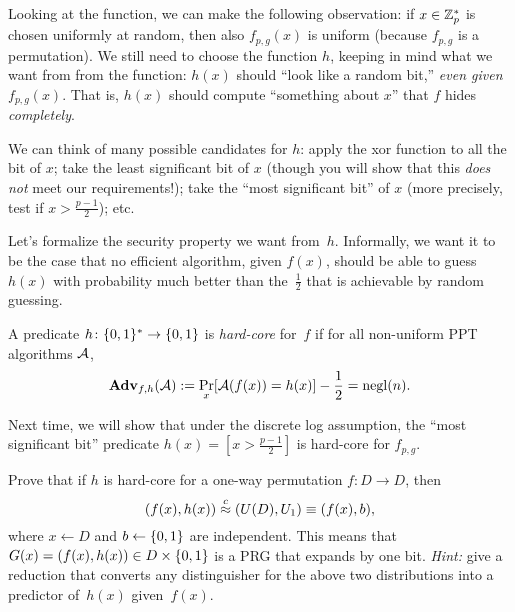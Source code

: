 \documentclass[11pt]{article}
\begin{document}
Looking at the function, we can make the following observation: if $x
\in \mathbb{Z}_p^{*}$ is chosen uniformly at random, then also $f_{p,g}(x)$ is
uniform (because $f_{p,g}$ is a permutation).  We still need to choose
the function $h$, keeping in mind what we want from from the function:
$h(x)$ should ``look like a random bit,'' \emph{even given
  $f_{p,g}(x)$}.  That is, $h(x)$ should compute ``something about
$x$'' that $f$ hides \emph{completely}.

We can think of many possible candidates for $h$: apply the xor
function to all the bit of $x$; take the least significant bit of $x$
(though you will show that this \emph{does not} meet our
requirements!); take the ``most significant bit'' of $x$ (more
precisely, test if $x>\frac{p-1}{2}$); etc.

Let's formalize the security property we want from~$h$. Informally, we
want it to be the case that no efficient algorithm, given $f(x)$,
should be able to guess $h(x)$ with probability much better than
the~$\frac{1}{2}$ that is achievable by random guessing.

\begin{definition}
  \label{def:hard-core-pred}
  A predicate $h \colon \{0,1\}^* \to \{0,1\}$ is \emph{hard-core} for~$f$
  if for all non-uniform PPT algorithms $\mathcal{A}$,
  \[ \mathbf{Adv}_{f,h}(\mathcal{A}) := \Pr_{x}[\mathcal{A}(f(x))=h(x)] - \frac12 =
    \operatorname{negl}(n). \]
\end{definition}

Next time, we will show that under the discrete log assumption, the
``most significant bit'' predicate $h(x) = [x > \frac{p-1}{2}]$ is
hard-core for $f_{p,g}$.

\begin{question}
  Prove that if $h$ is hard-core for a one-way permutation
  $f \colon D \to D$, then
  \[ (f(x),h(x)) \stackrel{c}{\approx} (U(D),U_1) \equiv (f(x),b), \] where
  $x \gets D$ and $b \gets \{0,1\}$ are independent.  This means that
  $G(x)=(f(x),h(x)) \in D \times \{0,1\}$ is a PRG that expands by one
  bit. \emph{Hint:} give a reduction that converts any distinguisher
  for the above two distributions into a predictor of~$h(x)$
  given~$f(x)$.
\end{question}
\end{document}
